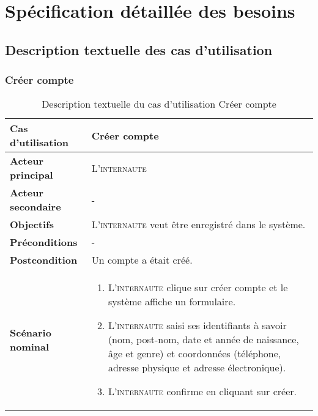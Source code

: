 \section[Spécification détaillée des besoins]{Spécification détaillée des besoins}
    \subsection[Description textuelle des cas d'utilisation]{Description textuelle des cas d’utilisation}
        \subsubsection[Créer compte]{Créer compte}
            \begin{longtable}{p{4cm} p{9cm}}
                \caption{Description textuelle du cas d’utilisation Créer compte}
                \label{table:usecaseCreeCompte}
                \\\hline\hline
                    \textbf{Cas d’utilisation} & \textbf{Créer compte}
                \\\hline\hline
                        \textbf{Acteur principal} & L’\textsc{internaute}
                    \\
                        \textbf{Acteur secondaire} & -
                    \\
                        \textbf{Objectifs} & L’\textsc{internaute} veut être 
                        enregistré dans le système.
                    \\
                        \textbf{Préconditions} & -
                    \\
                        \textbf{Postcondition} & Un compte a était créé.
                    \\
                        \textbf{Scénario nominal} &
                            \begin{enumerate}[leftmargin=*]
                                \item L’\textsc{internaute} clique sur créer compte et le
                                système affiche un formulaire.
                                \item L’\textsc{internaute} saisi ses identifiants à savoir
                                (nom, post-nom, date et année de
                                naissance, âge et genre) et coordonnées (téléphone, adresse physique
                                et adresse électronique).
                                \item L’\textsc{internaute} confirme en cliquant sur créer.

\end{enumerate}
\end{longtable}
